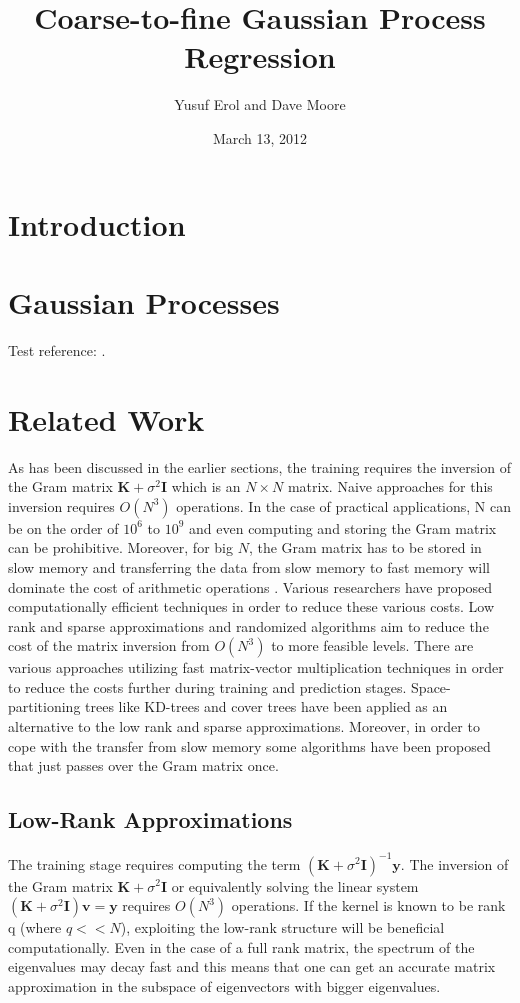 \documentclass{article}
\begin{document}
\title{Coarse-to-fine Gaussian Process Regression}
\author{Yusuf Erol and Dave Moore}
\date{March 13, 2012}
\maketitle

\section{Introduction}

\section{Gaussian Processes}

Test reference: \cite{rasmussen06}. 

\section{Related Work}
As has been discussed in the earlier sections, the training requires the inversion of the Gram matrix $\mathbf{K}+\sigma^2\mathbf{I}$ which is an $N\times N$ matrix. Naive approaches for this inversion requires $O(N^3)$ operations. In the case of practical applications, N can be on the order of $10^6$ to $10^9$ and even computing and storing the Gram matrix can be prohibitive. Moreover, for big $N$, the Gram matrix has to be stored in slow memory and transferring the data from slow memory to fast memory will dominate the cost of arithmetic operations \cite{RandomizedMatrixDecompose}.  Various researchers have proposed computationally efficient techniques in order to reduce these various costs. Low rank and sparse approximations and randomized algorithms aim to reduce the cost of the matrix inversion from $O(N^3)$ to more feasible levels. There are various approaches utilizing fast matrix-vector multiplication techniques in order to reduce the costs further during training and prediction stages. Space-partitioning trees like KD-trees and cover trees have been applied as an alternative to the low rank and sparse approximations. Moreover, in order to cope with the transfer from slow memory some algorithms have been proposed that just passes over the Gram matrix once.
\subsection{Low-Rank Approximations}
The training stage requires computing the term $(\mathbf{K}+\sigma^2\mathbf{I})^{-1}\mathbf{y}$. The inversion of the Gram matrix $\mathbf{K}+\sigma^2\mathbf{I}$ or equivalently solving the linear system $(\mathbf{K}+\sigma^2\mathbf{I})\mathbf{v}=\mathbf{y}$ requires $O(N^3)$ operations. If the kernel is known to be rank q (where $q<<N$), exploiting the low-rank structure will be beneficial computationally. Even in the case of a full rank matrix, the spectrum of the eigenvalues may decay fast and this means that one can get an accurate matrix approximation in the subspace of eigenvectors with bigger eigenvalues. 
\end{document}
